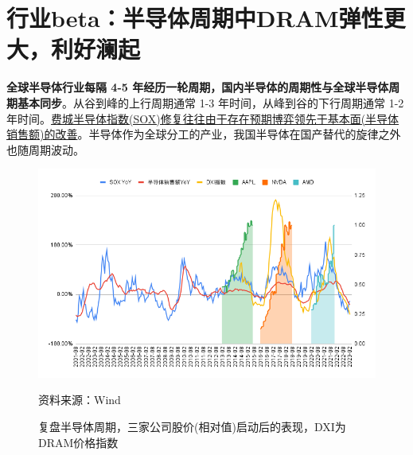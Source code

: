 \documentclass[a4paper,12pt]{ctexart}
\begin{document}
\section{行业beta：半导体周期中DRAM弹性更大，利好澜起}
\textbf{全球半导体行业每隔 4-5 年经历一轮周期，国内半导体的周期性与全球半导体周期基本同步}。从谷到峰的上行周期通常 1-3 年时间，从峰到谷的下行周期通常 1-2 年时间。\uline{费城半导体指数(SOX)修复往往由于存在预期博弈领先于基本面(半导体销售额)的改善}。半导体作为全球分工的产业，我国半导体在国产替代的旋律之外也随周期波动。
\begin{figure}[H]
    {\centering
        \caption{复盘半导体周期，三家公司股价(相对值)启动后的表现，DXI为DRAM价格指数}
        \includegraphics[width=0.8\linewidth]{img/sox.png}\par}
    \footnotesize{资料来源：Wind}
\end{figure}
\end{document}
